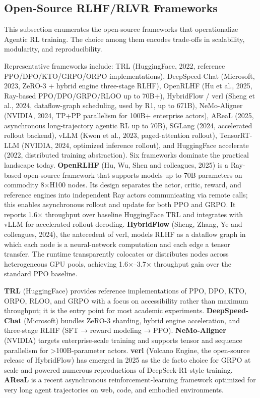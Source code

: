 \subsection{Open-Source RLHF/RLVR Frameworks}\label{open-source-rlhfrlvr-frameworks}

This subsection enumerates the open-source frameworks that operationalize Agentic RL training. The choice among them encodes trade-offs in scalability, modularity, and reproducibility.

Representative frameworks include: TRL (HuggingFace, 2022, reference PPO/DPO/KTO/GRPO/ORPO implementations), DeepSpeed-Chat (Microsoft, 2023, ZeRO-3 + hybrid engine three-stage RLHF), OpenRLHF (Hu et al., 2025, Ray-based PPO/DPO/GRPO/RLOO up to 70B+), HybridFlow / verl (Sheng et al., 2024, dataflow-graph scheduling, used by R1, up to 671B), NeMo-Aligner (NVIDIA, 2024, TP+PP parallelism for 100B+ enterprise actors), AReaL (2025, asynchronous long-trajectory agentic RL up to 70B), SGLang (2024, accelerated rollout backend), vLLM (Kwon et al., 2023, paged-attention rollout), TensorRT-LLM (NVIDIA, 2024, optimized inference rollout), and HuggingFace accelerate (2022, distributed training abstraction). Six frameworks dominate the practical landscape today. \textbf{OpenRLHF} (Hu, Wu, Shen and colleagues, 2025) is a Ray-based open-source framework that supports models up to 70B parameters on commodity 8×H100 nodes. Its design separates the actor, critic, reward, and reference engines into independent Ray actors communicating via remote calls; this enables asynchronous rollout and update for both PPO and GRPO. It reports 1.6× throughput over baseline HuggingFace TRL and integrates with vLLM for accelerated rollout decoding. \textbf{HybridFlow} (Sheng, Zhang, Ye and colleagues, 2024), the antecedent of verl, models RLHF as a dataflow graph in which each node is a neural-network computation and each edge a tensor transfer. The runtime transparently colocates or distributes nodes across heterogeneous GPU pools, achieving 1.6×--3.7× throughput gain over the standard PPO baseline.

\textbf{TRL} (HuggingFace) provides reference implementations of PPO, DPO, KTO, ORPO, RLOO, and GRPO with a focus on accessibility rather than maximum throughput; it is the entry point for most academic experiments. \textbf{DeepSpeed-Chat} (Microsoft) bundles ZeRO-3 sharding, hybrid engine acceleration, and three-stage RLHF (SFT → reward modeling → PPO). \textbf{NeMo-Aligner} (NVIDIA) targets enterprise-scale training and supports tensor and sequence parallelism for \textgreater100B-parameter actors. \textbf{verl} (Volcano Engine, the open-source release of HybridFlow) has emerged in 2025 as the de facto choice for GRPO at scale and powered numerous reproductions of DeepSeek-R1-style training. \textbf{AReaL} is a recent asynchronous reinforcement-learning framework optimized for very long agent trajectories on web, code, and embodied environments.


